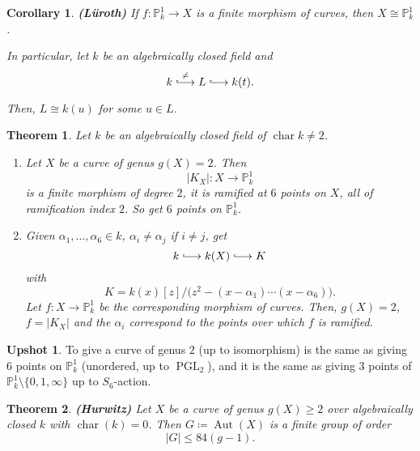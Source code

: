 \documentclass[12pt]{article}
\DeclareMathOperator{\PGL}{PGL}
\DeclareMathOperator{\chara}{char}
\DeclareMathOperator{\Aut}{Aut}
\newtheorem*{theorem}{Theorem}
\newtheorem*{corollary}{Corollary}
\theoremstyle{definition}
\newtheorem*{upshot}{Upshot}
\theoremstyle{remark}
\begin{document}
\begin{corollary}
\emph{\textbf{(L\"{u}roth)}} If $f:\mathbb{P}_k^1\rightarrow X$ is a finite morphism of curves, then $X\cong\mathbb{P}_k^1$.

In particular, let $k$ be an algebraically closed field and
\[k\overset{\neq}{\lhook\joinrel\longrightarrow}L\lhook\joinrel\longrightarrow k(t).\]

Then, $L\cong k(u)$ for some $u\in L$.
\end{corollary}

\begin{theorem}
Let $k$ be an algebraically closed field of $\chara k\neq2$.

\begin{enumerate}[label=\arabic*)]
\item Let $X$ be a curve of genus $g(X)=2$. Then
\[|K_X|:X\longrightarrow\mathbb{P}_k^1\]
is a finite morphism of degree $2$, it is ramified at $6$ points on $X$, all of ramification index $2$. So get $6$ points on $\mathbb{P}_k^1$.

\item Given $\alpha_1,\ldots,\alpha_6\in k$, $\alpha_i\neq\alpha_j$ if $i\neq j$, get
\[k\lhook\joinrel\longrightarrow k(X)\lhook\joinrel\longrightarrow K\]
with
\[K=k(x)[z]\big/\big(z^2-(x-\alpha_1)\cdots(x-\alpha_6)\big).\]
Let $f:X\rightarrow\mathbb{P}_k^1$ be the corresponding morphism of curves. Then, $g(X)=2$, $f=|K_X|$ and the $\alpha_i$ correspond to the points over which $f$ is ramified.
\end{enumerate}
\end{theorem}

\begin{upshot}
To give a curve of genus $2$ (up to isomorphism) is the same as giving $6$ points on $\mathbb{P}_k^1$ (unordered, up to $\PGL_2$), and it is the same as giving $3$ points of $\mathbb{P}_k^1\setminus\{0,1,\infty\}$ up to $S_6$-action.
\end{upshot}

\begin{theorem}
\emph{\textbf{(Hurwitz)}} Let $X$ be a curve of genus $g(X)\geq2$ over algebraically closed $k$ with $\chara(k)=0$. Then $G\coloneqq\Aut(X)$ is a finite group of order
\[|G|\leq84(g-1).\]
\end{theorem}
\end{document}
